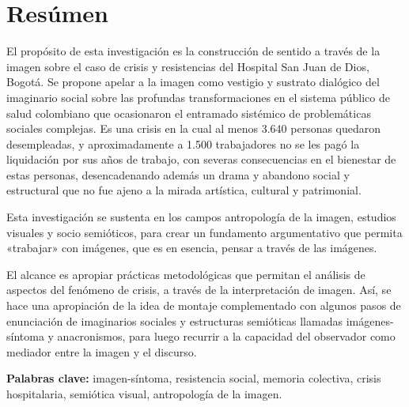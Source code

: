 \section*{Resúmen}
\setlength{\parskip}{1em}

El propósito de esta investigación es la construcción de sentido a través de la imagen sobre el caso de crisis y resistencias del Hospital San Juan de Dios, Bogotá. Se propone apelar a la imagen como vestigio y sustrato dialógico del imaginario social sobre las profundas transformaciones en el sistema público de salud colombiano que ocasionaron el entramado sistémico de problemáticas sociales complejas. Es una crisis en la cual al menos 3.640 personas quedaron desempleadas, y aproximadamente a 1.500 trabajadores no se les pagó la liquidación por sus años de trabajo, con severas consecuencias en el bienestar de estas personas, desencadenando además un drama y abandono social y estructural que no fue ajeno a la mirada artística, cultural y patrimonial.

Esta investigación se sustenta en los campos antropología de la imagen, estudios visuales y socio semióticos, para crear un fundamento argumentativo que permita «trabajar» con imágenes, que es en esencia, pensar a través de las imágenes.

El alcance es apropiar prácticas metodológicas que permitan el análisis de aspectos del fenómeno de crisis, a través de la interpretación de imagen. Así, se hace una apropiación de la idea de montaje complementado con algunos pasos de enunciación de imaginarios sociales y estructuras semióticas llamadas imágenes-síntoma y anacronismos, para luego recurrir a la capacidad del observador como mediador entre la imagen y el discurso.

\vspace{1cm}
\textbf{Palabras clave:} imagen-síntoma, resistencia social, memoria colectiva, crisis hospitalaria, semiótica visual, antropología de la imagen.
\pagebreak

